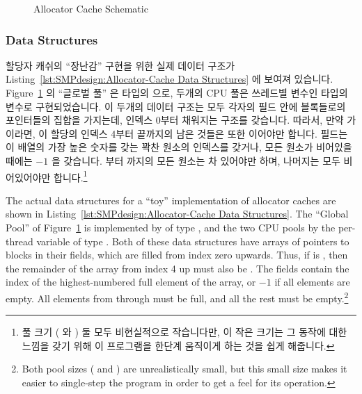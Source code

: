 \begin{figure}[tbp]
\centering
{}
\caption{Allocator Cache Schematic}
\label{fig:SMPdesign:Allocator Cache Schematic}
\end{figure}

\subsubsection{Data Structures}

할당자 캐쉬의 ``장난감'' 구현을 위한 실제 데이터 구조가
Listing~\ref{lst:SMPdesign:Allocator-Cache Data Structures} 에 보여져 있습니다.
Figure~\ref{fig:SMPdesign:Allocator Cache Schematic} 의 ``글로벌 풀'' 은
 타입의  으로, 두개의 CPU 풀은 쓰레드별
변수인  타입의  변수로
구현되었습니다.
이 두개의 데이터 구조는 모두 각자의  필드 안에 블록들로의 포인터들의
집합을 가지는데, 인덱스 0부터 채워지는 구조를 갖습니다.
따라서, 만약  가  이라면, 이 할당의 인덱스 4부터
끝까지의 남은 것들은 또한  이어야만 합니다.
 필드는 이  배열의 가장 높은 숫자를 갖는 꽉찬 원소의 인덱스를
갖거나, 모든 원소가 비어있을 때에는 $-1$ 을 갖습니다.
 부터  까지의 모든
원소는 차 있어야만 하며, 나머지는 모두 비어있어야만 합니다.\footnote{
	풀 크기 ( 와 ) 둘 모두
	비현실적으로 작습니다만, 이 작은 크기는 그 동작에 대한 느낌을 갖기 위해
	이 프로그램을 한단계 움직이게 하는 것을 쉽게 해줍니다.}

\iffalse

The actual data structures for a ``toy'' implementation of allocator
caches are shown in
Listing~\ref{lst:SMPdesign:Allocator-Cache Data Structures}.
The ``Global Pool'' of Figure~\ref{fig:SMPdesign:Allocator Cache Schematic}
is implemented by  of type ,
and the two CPU pools by the per-thread variable  of
type .
Both of these data structures have arrays of pointers to blocks
in their  fields, which are filled from index zero upwards.
Thus, if  is , then the remainder of
the array from index 4 up must also be .
The  fields contain the index of the highest-numbered full
element of the  array, or $-1$ if all elements are empty.
All elements from  through
 must be full, and all the rest
must be empty.\footnote{
	Both pool sizes ( and
	) are unrealistically small, but this small
	size makes it easier to single-step the program in order to get
	a feel for its operation.}

